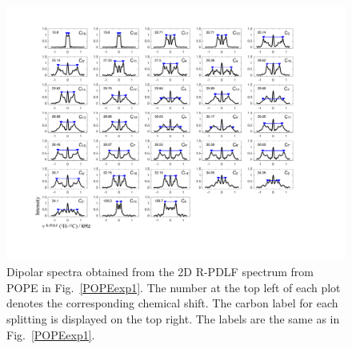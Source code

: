 \documentclass[fleqn,10pt]{wlscirep}
\begin{document}
\begin{figure}[p]
  \includegraphics[width=\textwidth]{Figures/POPE_slices.pdf}
  \caption{Dipolar spectra obtained from the 2D R-PDLF spectrum from POPE in Fig.~\ref{POPEexp1}. The number at the top left of each plot denotes the corresponding chemical shift. The carbon label for each splitting is displayed on the top right. The labels are the same as in Fig.~\ref{POPEexp1}.  }
  \label{POPEexp2}
\end{figure}
\end{document}

